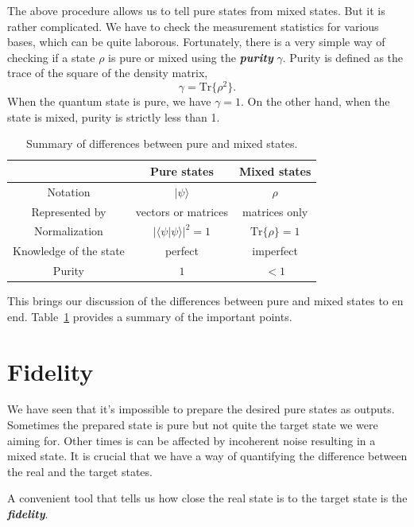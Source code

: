 The above procedure allows us to tell pure states from mixed states.
But it is rather complicated.
We have to check the measurement statistics for various bases, which can be quite laborous.
Fortunately, there is a very simple way of checking if a state $\rho$ is pure or mixed using the \textit{\textbf{purity}} $\gamma$.
Purity is defined as the trace of the square of the density matrix,
\begin{equation}
    \gamma = \text{Tr} \{ \rho^2 \}.
\end{equation}
When the quantum state is pure, we have $\gamma=1$.
On the other hand, when the state is mixed, purity is strictly less than 1.

\begin{table}[t]
    \centering
    \begin{tabular}{c|c|c}
         & Pure states & Mixed states \\
         \hline
        Notation & $|\psi\rangle$ & $\rho$ \\
        Represented by & vectors or matrices & matrices only \\
        Normalization & $|\langle\psi|\psi\rangle|^2=1$ & $\text{Tr}\{\rho\}=1$ \\
        Knowledge of the state & perfect & imperfect \\
        Purity & $1$ & $<1$ \\
    \end{tabular}
    \caption[Pure versus mixed states]{Summary of differences between pure and mixed states.}
    \label{tab:3-4_pure_vs_mixed}
\end{table}

This brings our discussion of the differences between pure and mixed states to en end.
Table~\ref{tab:3-4_pure_vs_mixed} provides a summary of the important points.




\section{Fidelity}
\label{sec:3-5_fidelity}

We have seen that it's impossible to prepare the desired pure states as outputs.
Sometimes the prepared state is pure but not quite the target state we were aiming for.
Other times is can be affected by incoherent noise resulting in a mixed state.
It is crucial that we have a way of quantifying the difference between the real and the target states.

A convenient tool that tells us how close the real state is to the target state is the \textit{\textbf{fidelity}}.


